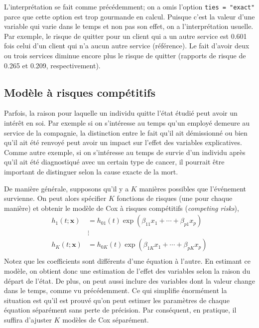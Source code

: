 \documentclass[
  11pt,
  letterpaper,
]{book}
\theoremstyle{definition}
\theoremstyle{remark}
\begin{document}
L'interprétation se fait comme précédemment; on a omis l'option
\texttt{ties\ =\ "exact"} parce que cette option est trop gourmande en
calcul. Puisque c'est la valeur d'une variable qui varie dans le temps
et non pas son effet, on a l'interprétation usuelle. Par exemple, le
risque de quitter pour un client qui a un autre service est 0.601 fois
celui d'un client qui n'a aucun autre service (référence). Le fait
d'avoir deux ou trois services diminue encore plus le risque de quitter
(rapports de risque de 0.265 et 0.209, respectivement).

\hypertarget{moduxe8le-uxe0-risques-compuxe9titifs}{%
\subsection{Modèle à risques
compétitifs}\label{moduxe8le-uxe0-risques-compuxe9titifs}}

Parfois, la raison pour laquelle un individu quitte l'état étudié peut
avoir un intérêt en soi. Par exemple si on s'intéresse au temps qu'un
employé demeure au service de la compagnie, la distinction entre le fait
qu'il ait démissionné ou bien qu'il ait été renvoyé peut avoir un impact
sur l'effet des variables explicatives. Comme autre exemple, si on
s'intéresse au temps de survie d'un individu après qu'il ait été
diagnostiqué avec un certain type de cancer, il pourrait être important
de distinguer selon la cause exacte de la mort.

De manière générale, supposons qu'il y a \(K\) manières possibles que
l'événement survienne. On peut alors spécifier \(K\) fonctions de
risques (une pour chaque manière) et obtenir le modèle de Cox à risques
compétitifs (\emph{competing risks}), \begin{align*}
h_1(t; \boldsymbol{x})&= h_{01}(t) \exp(\beta_{11}x_1 + \cdots + \beta_{p1} x_p)\\
&\vdots\\
h_K(t; \boldsymbol{x})&= h_{0K}(t) \exp(\beta_{1K}x_1 + \cdots + \beta_{pK} x_p)\\
\end{align*} Notez que les coefficients sont différents d'une équation à
l'autre. En estimant ce modèle, on obtient donc une estimation de
l'effet des variables selon la raison du départ de l'état. De plus, on
peut aussi inclure des variables dont la valeur change dans le temps,
comme vu précédemment. Ce qui simplifie énormément la situation est
qu'il est prouvé qu'on peut estimer les paramètres de chaque équation
séparément sans perte de précision. Par conséquent, en pratique, il
suffira d'ajuster \(K\) modèles de Cox séparément.
\end{document}
